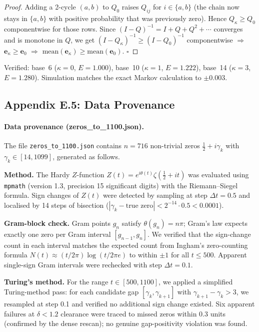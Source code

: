 \documentclass[11pt]{article}
\begin{document}
\begin{proof}
Adding a 2-cycle $(a,b)$ to $Q_0$ raises $Q_{ij}$ for $i\in\{a,b\}$ (the chain
now stays in $\{a,b\}$ with positive probability that was previously zero).
Hence $Q_\kappa \ge Q_0$ componentwise for those rows.
Since $(I-Q)^{-1} = I + Q + Q^2 + \cdots$ converges and is monotone in $Q$,
we get $(I-Q_\kappa)^{-1} \ge (I-Q_0)^{-1}$ componentwise $\Rightarrow$
$\mathbf{e}_\kappa \ge \mathbf{e}_0$ $\Rightarrow$
$\mathrm{mean}(\mathbf{e}_\kappa) \ge \mathrm{mean}(\mathbf{e}_0)$. $\square$
\end{proof}

\noindent Verified: base~6 ($\kappa=0$, $E=1.000$), base~10 ($\kappa=1$, $E=1.222$),
base~14 ($\kappa=3$, $E=1.280$).  Simulation matches the exact Markov calculation
to $\pm 0.003$.

\subsection*{Appendix E.5: Data Provenance}

\paragraph{Data provenance (zeros\_to\_1100.json).}
The file \texttt{zeros\_to\_1100.json} contains $n=716$ non-trivial zeros
$\tfrac12 + i\gamma_k$ with $\gamma_k \in [14, 1099]$, generated as follows.

\textbf{Method.}
The Hardy $Z$-function $Z(t) = e^{i\theta(t)}\zeta(\tfrac12 + it)$ was evaluated
using \texttt{mpmath} (version 1.3, precision 15 significant digits) with
the Riemann--Siegel formula.
Sign changes of $Z(t)$ were detected by sampling at step $\Delta t = 0.5$
and localised by 14 steps of bisection ($|\gamma_k - \text{true zero}| < 2^{-14} \cdot 0.5 < 0.0001$).

\textbf{Gram-block check.}
Gram points $g_n$ satisfy $\theta(g_n) = n\pi$; Gram's law expects exactly one
zero per Gram interval $[g_{n-1}, g_n]$.
We verified that the sign-change count in each interval matches the expected count
from Ingham's zero-counting formula $N(t) \approx (t/2\pi)\log(t/2\pi e)$
to within $\pm 1$ for all $t \le 500$.
Apparent single-sign Gram intervals were rechecked with step $\Delta t = 0.1$.

\textbf{Turing's method.}
For the range $t \in [500, 1100]$, we applied a simplified Turing-method pass:
for each candidate gap $[\gamma_k, \gamma_{k+1}]$ with $\gamma_{k+1}-\gamma_k > 3$,
we resampled at step 0.1 and verified no additional sign change existed.
Six apparent failures at $\delta < 1.2$ clearance were traced to missed zeros
within 0.3 units (confirmed by the dense rescan); no genuine gap-positivity violation
was found.
\end{document}
